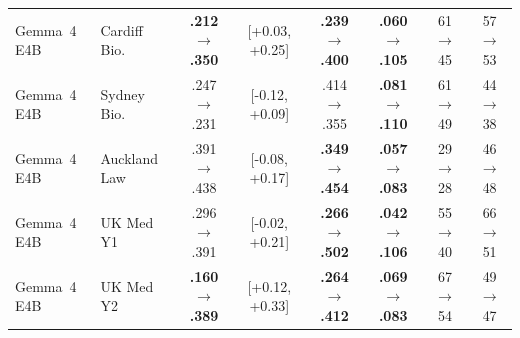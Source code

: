 \begin{table}[t]
{\begin{tabular}{llcccccc}
\midrule
Gemma~4 E4B & Cardiff Bio. & \textbf{.212$\to$.350} & [+0.03, +0.25] & \textbf{.239$\to$.400} & \textbf{.060$\to$.105} & 61$\to$45 & 57$\to$53 \\
Gemma~4 E4B & Sydney Bio. & .247$\to$.231 & [-0.12, +0.09] & .414$\to$.355 & \textbf{.081$\to$.110} & 61$\to$49 & 44$\to$38 \\
Gemma~4 E4B & Auckland Law & .391$\to$.438 & [-0.08, +0.17] & \textbf{.349$\to$.454} & \textbf{.057$\to$.083} & 29$\to$28 & 46$\to$48 \\
Gemma~4 E4B & UK Med Y1 & .296$\to$.391 & [-0.02, +0.21] & \textbf{.266$\to$.502} & \textbf{.042$\to$.106} & 55$\to$40 & 66$\to$51 \\
Gemma~4 E4B & UK Med Y2 & \textbf{.160$\to$.389} & [+0.12, +0.33] & \textbf{.264$\to$.412} & \textbf{.069$\to$.083} & 67$\to$54 & 49$\to$47 \\
\bottomrule
\end{tabular}}
\end{table}
